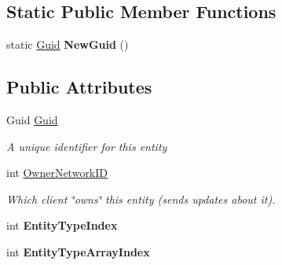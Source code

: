 \subsection*{Static Public Member Functions}
\begin{DoxyCompactItemize}
\item 
\hypertarget{class_skyrates_1_1_common_1_1_entity_1_1_entity_ace456648a3f02f014603fd4a0d38e468}{static \hyperlink{class_skyrates_1_1_common_1_1_entity_1_1_entity_ae32af79e6a33bed16aeb0455078885c8}{Guid} {\bfseries New\-Guid} ()}\label{class_skyrates_1_1_common_1_1_entity_1_1_entity_ace456648a3f02f014603fd4a0d38e468}

\end{DoxyCompactItemize}
\subsection*{Public Attributes}
\begin{DoxyCompactItemize}
\item 
Guid \hyperlink{class_skyrates_1_1_common_1_1_entity_1_1_entity_ae32af79e6a33bed16aeb0455078885c8}{Guid}
\begin{DoxyCompactList}\small\item\em A unique identifier for this entity \end{DoxyCompactList}\item 
int \hyperlink{class_skyrates_1_1_common_1_1_entity_1_1_entity_a855cbcf588c2b4c490c2ddc157e11029}{Owner\-Network\-I\-D}
\begin{DoxyCompactList}\small\item\em Which client \char`\"{}owns\char`\"{} this entity (sends updates about it). \end{DoxyCompactList}\item 
\hypertarget{class_skyrates_1_1_common_1_1_entity_1_1_entity_ac85067eae70ede125a003cfd42f8bf6b}{int {\bfseries Entity\-Type\-Index}}\label{class_skyrates_1_1_common_1_1_entity_1_1_entity_ac85067eae70ede125a003cfd42f8bf6b}

\item 
\hypertarget{class_skyrates_1_1_common_1_1_entity_1_1_entity_a41172d758138982a7dfa86d470e61c70}{int {\bfseries Entity\-Type\-Array\-Index}}\label{class_skyrates_1_1_common_1_1_entity_1_1_entity_a41172d758138982a7dfa86d470e61c70}

\end{DoxyCompactItemize}
